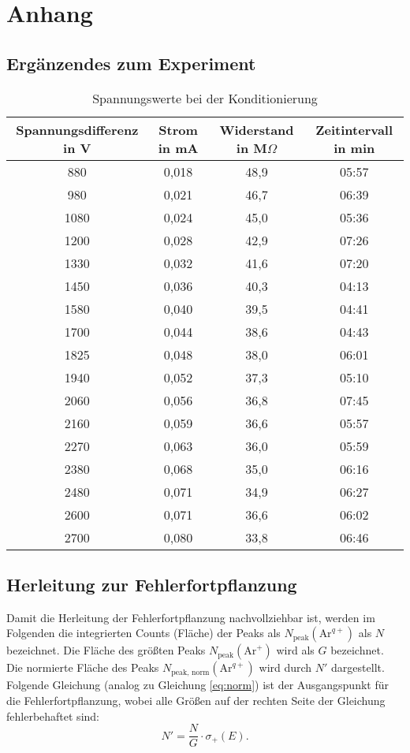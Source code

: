 \appendix
\chapter[]{Anhang}
\section{Ergänzendes zum Experiment}

\begin{table}[H]
    \caption{Spannungswerte bei der Konditionierung}
    \label{tab:Konditionierung}
    \begin{tabular}{cccc}
        Spannungsdifferenz in V & Strom in mA &	Widerstand in M$\Omega$ & Zeitintervall in min\\   
        \midrule
            880  & 0,018 & 48,9 & 05:57\\
            980  & 0,021 & 46,7 & 06:39\\
            1080 & 0,024 & 45,0 & 05:36\\
            1200 & 0,028 & 42,9 & 07:26\\
            1330 & 0,032 & 41,6 & 07:20\\
            1450 & 0,036 & 40,3 & 04:13\\
            1580 & 0,040 & 39,5 & 04:41\\
            1700 & 0,044 & 38,6 & 04:43\\
            1825 & 0,048 & 38,0 & 06:01\\
            1940 & 0,052 & 37,3 & 05:10\\
            2060 & 0,056 & 36,8 & 07:45\\
            2160 & 0,059 & 36,6 & 05:57\\
            2270 & 0,063 & 36,0 & 05:59\\
            2380 & 0,068 & 35,0 & 06:16\\
            2480 & 0,071 & 34,9 & 06:27\\
            2600 & 0,071 & 36,6 & 06:02\\
            2700 & 0,080 & 33,8 & 06:46\\      
    \end{tabular}
\end{table}

\section{Herleitung zur Fehlerfortpflanzung}
\label{sec:fehlerfortpflanzung}
Damit die Herleitung der Fehlerfortpflanzung nachvollziehbar ist, werden im Folgenden die integrierten Counts (Fläche) der Peaks als $N_\text{peak}(\text{Ar}^{q+})$ als $N$ bezeichnet. Die Fläche des größten Peaks $N_\text{peak}(\text{Ar}^{+})$ wird als $G$ bezeichnet. Die normierte Fläche des Peaks $N_\text{peak, norm}(\text{Ar}^{q+})$ wird durch $N'$ dargestellt. Folgende Gleichung (analog zu Gleichung \ref{eq:norm}) ist der Ausgangspunkt für die Fehlerfortpflanzung, wobei alle Größen auf der rechten Seite der Gleichung fehlerbehaftet sind:
\begin{equation}
    N' = \frac{N}{G} \cdot \sigma_+(E).
\end{equation}

